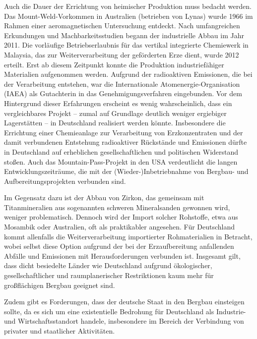 \documentclass[12pt,a4paper,oneside]{book} %
\begin{document}
Auch die Dauer der Errichtung von heimischer Produktion muss bedacht werden. Das Mount-Weld-Vorkommen in Australien (betrieben von Lynas) wurde 1966 im Rahmen einer aeromagnetischen Untersuchung entdeckt. Nach umfangreichen Erkundungen und Machbarkeitsstudien begann der industrielle Abbau im Jahr 2011. Die vorläufige Betriebserlaubnis für das vertikal integrierte Chemiewerk in Malaysia, das zur Weiterverarbeitung der geförderten Erze dient, wurde 2012 erteilt. Erst ab diesem Zeitpunkt konnte die Produktion industriefähiger Materialien aufgenommen werden. Aufgrund der radioaktiven Emissionen, die bei der Verarbeitung entstehen, war die Internationale Atomenergie-Organisation (IAEA) als Gutachterin in das Genehmigungsverfahren eingebunden. Vor dem Hintergrund dieser Erfahrungen erscheint es wenig wahrscheinlich, dass ein vergleichbares Projekt – zumal auf Grundlage deutlich weniger ergiebiger Lagerstätten – in Deutschland realisiert werden könnte. Insbesondere die Errichtung einer Chemieanlage zur Verarbeitung von Erzkonzentraten und der damit verbundenen Entstehung radioaktiver Rückstände und Emissionen dürfte in Deutschland auf erheblichen gesellschaftlichen und politischen Widerstand stoßen. Auch das Mountain-Pass-Projekt in den USA verdeutlicht die langen Entwicklungszeiträume, die mit der (Wieder-)Inbetriebnahme von Bergbau- und Aufbereitungsprojekten verbunden sind.

Im Gegensatz dazu ist der Abbau von Zirkon, das gemeinsam mit Titanmineralien aus sogenannten schweren Mineralsanden gewonnen wird, weniger problematisch. Dennoch wird der Import solcher Rohstoffe, etwa aus Mosambik oder Australien, oft als praktikabler angesehen. Für Deutschland kommt allenfalls die Weiterverarbeitung importierter Rohmaterialien in Betracht, wobei selbst diese Option aufgrund der bei der Erzaufbereitung anfallenden Abfälle und Emissionen mit Herausforderungen verbunden ist. Insgesamt gilt, dass dicht besiedelte Länder wie Deutschland aufgrund ökologischer, gesellschaftlicher und raumplanerischer Restriktionen kaum mehr für großflächigen Bergbau geeignet sind.

Zudem gibt es Forderungen, dass der deutsche Staat in den Bergbau einsteigen sollte, da es sich um eine existentielle Bedrohung für Deutschland als Industrie- und Wirtschaftsstandort handele, insbesondere im Bereich der Verbindung von privater und staatlicher Aktivitäten.\autocite{https://www.africa-business-guide.de/de/praxis/erfahrungen/schluesselrolle-afrikas-bedeutung-bei-den-kritischen-rohstoffen--1920084}
\end{document}
